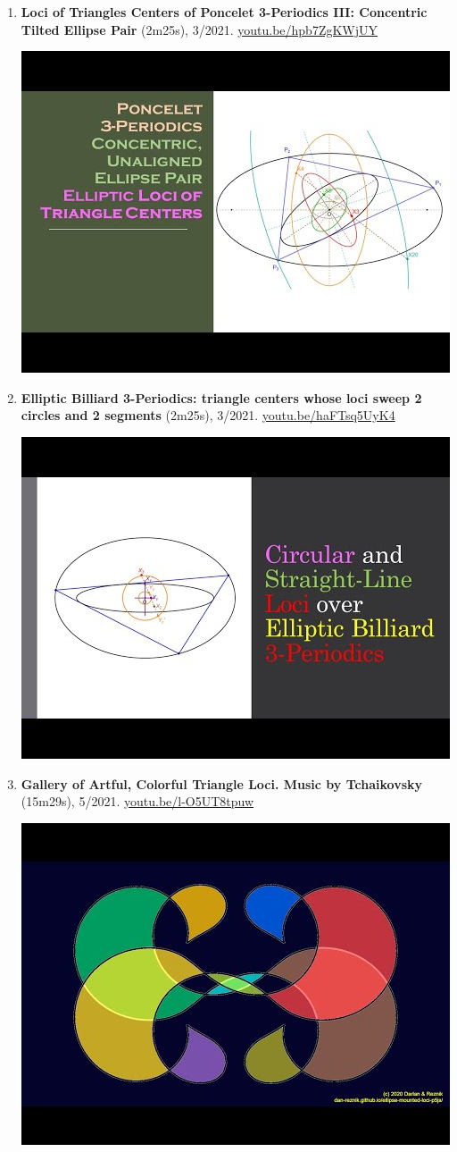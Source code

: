 \documentclass[12pt]{article}
\begin{document}
\begin{enumerate}[resume]
% 
\item \textbf{Loci of Triangles Centers of Poncelet 3-Periodics III: Concentric Tilted Ellipse Pair} (2m25s), 3/2021. \href{https://youtu.be/hpb7ZgKWjUY}{\url{youtu.be/hpb7ZgKWjUY}}
\begin{center}\includegraphics[width=.5\textwidth]{pics/hpb7ZgKWjUY.jpg}\end{center}
% 
\item \textbf{Elliptic Billiard 3-Periodics: triangle centers whose loci sweep 2 circles and 2 segments} (2m25s), 3/2021. \href{https://youtu.be/haFTsq5UyK4}{\url{youtu.be/haFTsq5UyK4}}
\begin{center}\includegraphics[width=.5\textwidth]{pics/haFTsq5UyK4.jpg}\end{center}
% 
\item \textbf{Gallery of Artful, Colorful Triangle Loci. Music by Tchaikovsky} (15m29s), 5/2021. \href{https://youtu.be/l-O5UT8tpuw}{\url{youtu.be/l-O5UT8tpuw}}
\begin{center}\includegraphics[width=.5\textwidth]{pics/l-O5UT8tpuw.jpg}\end{center}

\end{enumerate}
\end{document}
